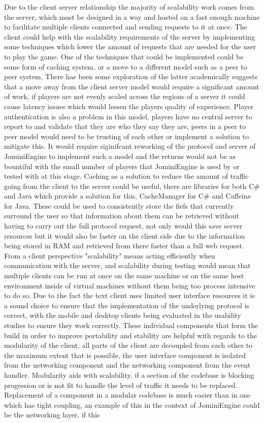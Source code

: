 \documentclass{article}
\begin{document}
Due to the client server relationship the majority of scalability work comes from the server, which must be designed in a way and hosted on a fast enough machine to facilitate multiple clients connected and sending requests to it at once. The client could help with the scalability requirements of the server by implementing some techniques which lower the amount of requests that are needed for the user to play the game. One of the techniques that could be implemented could be some form of caching system, or a move to a different model such as a peer to peer system. There has been some exploration of the latter academically\cite{1354485} suggests that a move away from the client server model would require a significant amount of work, if players are not evenly scaled across the regions of a server it could cause latency issues which would lessen the players quality of experience. Player authentication is also a problem in this model, players have no central server to report to and validate that they are who they say they are, peers in a peer to peer model would need to be trusting of each other or implement a solution to mitigate this. It would require siginifcant reworking of the protocol and server of JominiEngine to implement such a model and the returns would not be as bountiful with the small number of players that JominiEngine is used by or tested with at this stage. Caching as a solution to reduce the amount of traffic going from the client to the server could be useful, there are libraries for both C\# and Java which provide a solution for this, CacheManager\cite{CacheManager} for C\# and Caffeine\cite{Caffeine} for Java. These could be used to consistently store the fiefs that currently surround the user so that information about them can be retrieved without having to carry out the full protocol request, not only would this save server resources but it would also be faster on the client side due to the information being stored in RAM and retrieved from there faster than a full web request. From a client perspective "scalability" means acting efficiently when communication with the server, and scalability during testing would mean that multiple clients can be run at once on the same machine or on the same host environment inside of virtual machines without them being too process intensive to do so. Due to the fact the text client uses limited user interface resources it is a sound choice to ensure that the implementation of the underlying protocol is correct, with the mobile and desktop clients being evaluated in the usability studies to ensure they work correctly. These individual components that form the build in order to improve portability and stability are helpful with regards to the modularity of the client, all parts of the client are decoupled from each other to the maximum extent that is possible, the user interface component is isolated from the networking component and the networking component from the event handler. Modularity aids with scalability, if a section of the codebase is blocking progession or is not fit to handle the level of traffic it needs to be replaced. Replacement of a component in a modular codebase is much easier than in one which has tight coupling, an example of this in the context of JominiEngine could be the networking layer, if this 
\end{document}
